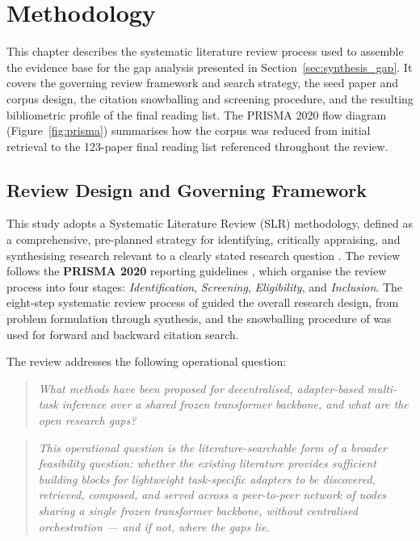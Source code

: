 \section{Methodology}
\label{sec:methodology}

This chapter describes the systematic literature review process used to
assemble the evidence base for the gap analysis presented in
Section~\ref{sec:synthesis_gap}. It covers the governing review framework
and search strategy, the seed paper and corpus design, the citation
snowballing and screening procedure, and the resulting bibliometric profile
of the final reading list. The PRISMA 2020 flow diagram
(Figure~\ref{fig:prisma}) summarises how the corpus was reduced
from initial retrieval to the 123-paper final reading list referenced
throughout the review.

\subsection{Review Design and Governing Framework}
\label{sec:methodology:framework}

This study adopts a Systematic Literature Review (SLR) methodology, defined as a
comprehensive, pre-planned strategy for identifying, critically appraising, and synthesising
research relevant to a clearly stated research question \citep{KitchenhamCharters2007}.
The review follows the \textbf{PRISMA 2020} reporting guidelines \citep{Page2021}, which
organise the review process into four stages: \textit{Identification}, \textit{Screening},
\textit{Eligibility}, and \textit{Inclusion}. The eight-step systematic review process of
\citet{XiaoWatson2019} guided the overall research design, from problem formulation
through synthesis, and the snowballing procedure of \citet{Wohlin2014} was used for
forward and backward citation search.


The review addresses the following operational question:
\begin{quote}
\textit{What methods have been proposed for decentralised, adapter-based multi-task inference over a shared frozen transformer backbone, and what are the open research gaps?}
\end{quote}
\begin{quote}
\textit{This operational question is the literature-searchable form of a broader feasibility question: whether the existing literature provides sufficient building blocks for lightweight task-specific adapters to be discovered, retrieved, composed, and served across a peer-to-peer network of nodes sharing a single frozen transformer backbone, without centralised orchestration — and if not, where the gaps lie.}
\end{quote}


